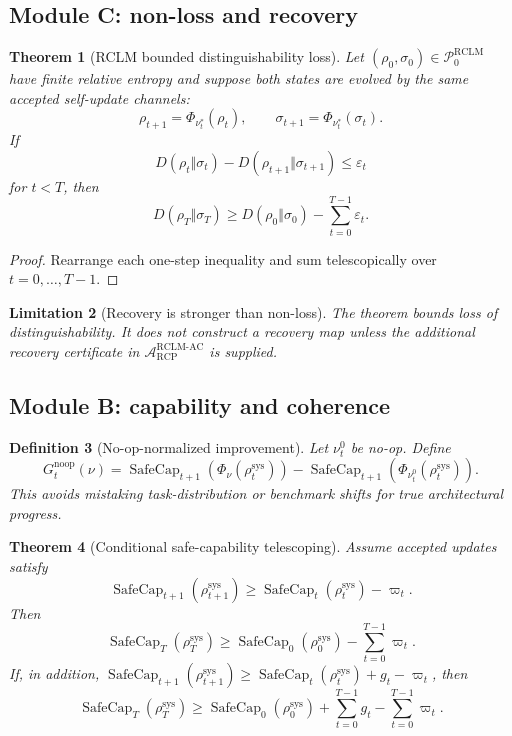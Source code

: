 \documentclass[11pt,a4paper]{article}
\newtheorem{theorem}{Theorem}[section]
\newtheorem{definition}[theorem]{Definition}
\newtheorem{limitation}[theorem]{Limitation}
\newcommand{\Pcal}{\mathcal P}
\newcommand{\Acal}{\mathcal A}
\newcommand{\eps}{\varepsilon}
\newcommand{\RCP}{\mathrm{RCP}}
\newcommand{\RCLM}{\mathrm{RCLM}}
\newcommand{\AC}{\mathrm{AC}}
\newcommand{\sys}{\mathrm{sys}}
\newcommand{\SafeCap}{\operatorname{SafeCap}}
\begin{document}
\subsection{Module C: non-loss and recovery}

\begin{theorem}[RCLM bounded distinguishability loss]
Let \((\rho_0,\sigma_0)\in\Pcal_0^{\RCLM}\) have finite relative entropy and suppose both states are evolved by the same accepted self-update channels:
\[
\rho_{t+1}=\Phi_{\nu_t^*}(\rho_t),
\qquad
\sigma_{t+1}=\Phi_{\nu_t^*}(\sigma_t).
\]
If
\[
D(\rho_t\Vert\sigma_t)-D(\rho_{t+1}\Vert\sigma_{t+1})\le\eps_t
\]
for \(t<T\), then
\[
D(\rho_T\Vert\sigma_T)
\ge
D(\rho_0\Vert\sigma_0)-\sum_{t=0}^{T-1}\eps_t.
\]
\end{theorem}

\begin{proof}
Rearrange each one-step inequality and sum telescopically over \(t=0,\ldots,T-1\).
\end{proof}

\begin{limitation}[Recovery is stronger than non-loss]
The theorem bounds loss of distinguishability. It does not construct a recovery map unless the additional recovery certificate in \(\Acal_{\RCP}^{\RCLM\text{-}\AC}\) is supplied.
\end{limitation}

\subsection{Module B: capability and coherence}

\begin{definition}[No-op-normalized improvement]
\label{def:noop-normalized-improvement}
Let \(\nu_t^0\) be no-op. Define
\[
G_t^{\mathrm{noop}}(\nu)=
\SafeCap_{t+1}(\Phi_\nu(\rho_t^{\sys}))
-
\SafeCap_{t+1}(\Phi_{\nu_t^0}(\rho_t^{\sys})).
\]
This avoids mistaking task-distribution or benchmark shifts for true architectural progress.
\end{definition}

\begin{theorem}[Conditional safe-capability telescoping]
Assume accepted updates satisfy
\[
\SafeCap_{t+1}(\rho_{t+1}^{\sys})
\ge
\SafeCap_t(\rho_t^{\sys})-\varpi_t.
\]
Then
\[
\SafeCap_T(\rho_T^{\sys})
\ge
\SafeCap_0(\rho_0^{\sys})-
\sum_{t=0}^{T-1}\varpi_t.
\]
If, in addition, \(\SafeCap_{t+1}(\rho_{t+1}^{\sys})\ge\SafeCap_t(\rho_t^{\sys})+g_t-\varpi_t\), then
\[
\SafeCap_T(\rho_T^{\sys})
\ge
\SafeCap_0(\rho_0^{\sys})+
\sum_{t=0}^{T-1}g_t-
\sum_{t=0}^{T-1}\varpi_t.
\]
\end{theorem}
\end{document}
